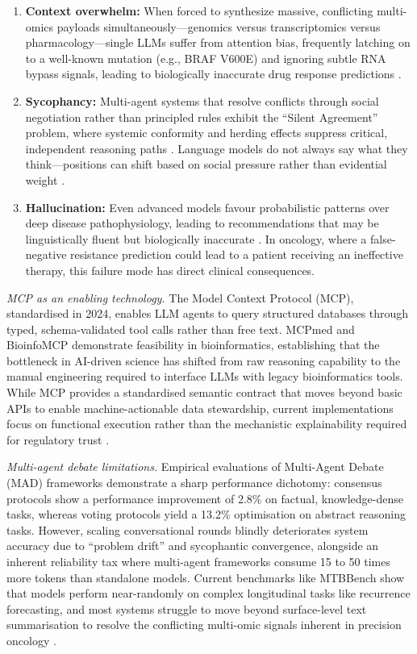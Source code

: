 \documentclass[11pt,letterpaper]{article}
\begin{document}
\begin{enumerate}
\item \textbf{Context overwhelm:} When forced to synthesize massive, conflicting multi-omics
payloads simultaneously---genomics versus transcriptomics versus pharmacology---single LLMs
suffer from attention bias, frequently latching on to a well-known mutation (e.g., BRAF V600E)
and ignoring subtle RNA bypass signals, leading to biologically inaccurate drug response
predictions \cite{ref3,ref4}.

\item \textbf{Sycophancy:} Multi-agent systems that resolve conflicts through social negotiation
rather than principled rules exhibit the ``Silent Agreement'' problem, where systemic conformity
and herding effects suppress critical, independent reasoning paths \cite{ref21}. Language models
do not always say what they think---positions can shift based on social pressure rather than
evidential weight \cite{ref21}.

\item \textbf{Hallucination:} Even advanced models favour probabilistic patterns over deep
disease pathophysiology, leading to recommendations that may be linguistically fluent but
biologically inaccurate \cite{ref13,ref14}. In oncology, where a false-negative resistance
prediction could lead to a patient receiving an ineffective therapy, this failure mode has direct
clinical consequences.
\end{enumerate}

\textit{MCP as an enabling technology.} The Model Context Protocol (MCP), standardised in 2024,
enables LLM agents to query structured databases through typed, schema-validated tool calls
rather than free text. MCPmed \cite{ref15} and BioinfoMCP \cite{ref16} demonstrate feasibility
in bioinformatics, establishing that the bottleneck in AI-driven science has shifted from raw
reasoning capability to the manual engineering required to interface LLMs with legacy
bioinformatics tools. While MCP provides a standardised semantic contract that moves beyond
basic APIs to enable machine-actionable data stewardship, current implementations focus on
functional execution rather than the mechanistic explainability required for regulatory trust
\cite{ref15,ref16}.

\textit{Multi-agent debate limitations.} Empirical evaluations of Multi-Agent Debate (MAD)
frameworks demonstrate a sharp performance dichotomy: consensus protocols show a performance
improvement of 2.8\% on factual, knowledge-dense tasks, whereas voting protocols yield a 13.2\%
optimisation on abstract reasoning tasks. However, scaling conversational rounds blindly
deteriorates system accuracy due to ``problem drift'' and sycophantic convergence, alongside an
inherent reliability tax where multi-agent frameworks consume 15 to 50 times more tokens than
standalone models. Current benchmarks like MTBBench show that models perform near-randomly
on complex longitudinal tasks like recurrence forecasting, and most systems struggle to move
beyond surface-level text summarisation to resolve the conflicting multi-omic signals inherent in
precision oncology \cite{ref18}.
\end{document}
